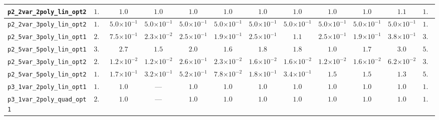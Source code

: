 \begin{landscape}
\begin{table}[H]
{\begin{tabular}{lccccccccccc}
\hline
\texttt{p2\_2var\_2poly\_lin\_opt2} & $1.0$ & \textbf{$1.0$} & \textbf{$1.0$} & \textbf{$1.0$} & \textbf{$1.0$} & \textbf{$1.0$} & \textbf{$1.0$} & \textbf{$1.0$} & \textbf{$1.0$} & $1.1$ & $1.0$ \\
\hline
\texttt{p2\_2var\_3poly\_lin\_opt2} & $1.6$ & \textbf{$5.0{\scriptstyle\times 10^{-1}}$} & \textbf{$5.0{\scriptstyle\times 10^{-1}}$} & \textbf{$5.0{\scriptstyle\times 10^{-1}}$} & \textbf{$5.0{\scriptstyle\times 10^{-1}}$} & \textbf{$5.0{\scriptstyle\times 10^{-1}}$} & \textbf{$5.0{\scriptstyle\times 10^{-1}}$} & \textbf{$5.0{\scriptstyle\times 10^{-1}}$} & \textbf{$5.0{\scriptstyle\times 10^{-1}}$} & $5.0{\scriptstyle\times 10^{-1}}$ & $1.5$ \\
\hline
\texttt{p2\_5var\_3poly\_lin\_opt1} & $2.0$ & $7.5{\scriptstyle\times 10^{-1}}$ & \textbf{$2.3{\scriptstyle\times 10^{-2}}$} & $2.5{\scriptstyle\times 10^{-1}}$ & $1.9{\scriptstyle\times 10^{-1}}$ & $2.5{\scriptstyle\times 10^{-1}}$ & $1.1$ & $2.5{\scriptstyle\times 10^{-1}}$ & $1.9{\scriptstyle\times 10^{-1}}$ & $3.8{\scriptstyle\times 10^{-1}}$ & $3.0$ \\
\hline
\texttt{p2\_5var\_5poly\_lin\_opt1} & $3.2$ & $2.7$ & $1.5$ & $2.0$ & $1.6$ & $1.8$ & $1.8$ & \textbf{$1.0$} & $1.7$ & $3.0$ & $5.0$ \\
\hline
\texttt{p2\_5var\_3poly\_lin\_opt2} & $2.5$ & \textbf{$1.2{\scriptstyle\times 10^{-2}}$} & \textbf{$1.2{\scriptstyle\times 10^{-2}}$} & $2.6{\scriptstyle\times 10^{-1}}$ & $2.3{\scriptstyle\times 10^{-2}}$ & $1.6{\scriptstyle\times 10^{-2}}$ & $1.6{\scriptstyle\times 10^{-2}}$ & \textbf{$1.2{\scriptstyle\times 10^{-2}}$} & $1.6{\scriptstyle\times 10^{-2}}$ & $6.2{\scriptstyle\times 10^{-2}}$ & $3.0$ \\
\hline
\texttt{p2\_5var\_5poly\_lin\_opt2} & $1.5$ & $1.7{\scriptstyle\times 10^{-1}}$ & $3.2{\scriptstyle\times 10^{-1}}$ & $5.2{\scriptstyle\times 10^{-1}}$ & \textbf{$7.8{\scriptstyle\times 10^{-2}}$} & $1.8{\scriptstyle\times 10^{-1}}$ & $3.4{\scriptstyle\times 10^{-1}}$ & $1.5$ & $1.5$ & $1.3$ & $5.0$ \\
\hline
\texttt{p3\_1var\_2poly\_lin\_opt1} & $1.1$ & \textbf{$1.0$} & --- & \textbf{$1.0$} & \textbf{$1.0$} & \textbf{$1.0$} & \textbf{$1.0$} & \textbf{$1.0$} & \textbf{$1.0$} & $1.0$ & $1.3$ \\
\hline
\texttt{p3\_1var\_2poly\_quad\_opt1} & $2.0$ & \textbf{$1.0$} & --- & \textbf{$1.0$} & \textbf{$1.0$} & \textbf{$1.0$} & \textbf{$1.0$} & \textbf{$1.0$} & \textbf{$1.0$} & $1.0$ & $1.0$ \\

\end{tabular}}
\end{table}
\end{landscape}
